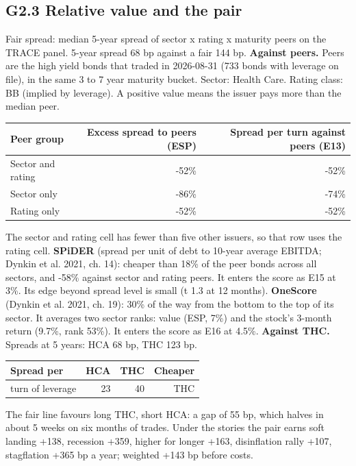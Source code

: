 \documentclass[11pt,a4paper]{article}
\begin{document}
\subsection*{G2.3 Relative value and the pair}
Fair spread: median 5-year spread of sector x rating x maturity peers on the TRACE panel. 5-year spread 68 bp against a fair 144 bp.
\textbf{Against peers.} Peers are the high yield bonds that traded in 2026-08-31 (733 bonds with leverage on file), in the same 3 to 7 year maturity bucket. Sector: Health Care. Rating class: BB (implied by leverage). A positive value means the issuer pays more than the median peer.
\begin{center}\footnotesize\setlength{\tabcolsep}{3.5pt}\begin{tabular}{@{}lrr@{}}\toprule
Peer group & Excess spread to peers (ESP) & Spread per turn against peers (E13) \\\midrule
Sector and rating & -52\% & -52\% \\
Sector only & -86\% & -74\% \\
Rating only & -52\% & -52\% \\
\bottomrule\end{tabular}\end{center}
The sector and rating cell has fewer than five other issuers, so that row uses the rating cell.
\textbf{SPiDER} (spread per unit of debt to 10-year average EBITDA; Dynkin et al. 2021, ch. 14): cheaper than 18\% of the peer bonds across all sectors, and -58\% against sector and rating peers. It enters the score as E15 at 3\%. Its edge beyond spread level is small (t 1.3 at 12 months).
\textbf{OneScore} (Dynkin et al. 2021, ch. 19): 30\% of the way from the bottom to the top of its sector. It averages two sector ranks: value (ESP, 7\%) and the stock's 3-month return (9.7\%, rank 53\%). It enters the score as E16 at 4.5\%.
\textbf{Against THC.} Spreads at 5 years: HCA 68 bp, THC 123 bp.
\begin{center}\footnotesize\setlength{\tabcolsep}{3.5pt}\begin{tabular}{@{}lrrr@{}}\toprule
Spread per & HCA & THC & Cheaper \\\midrule
turn of leverage & 23 & 40 & THC \\
\bottomrule\end{tabular}\end{center}
The fair line favours long THC, short HCA: a gap of 55 bp, which halves in about 5 weeks on six months of trades. Under the stories the pair earns soft landing +138, recession +359, higher for longer +163, disinflation rally +107, stagflation +365 bp a year; weighted +143 bp before costs.
\end{document}
